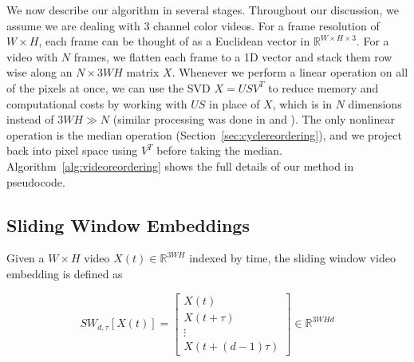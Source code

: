 \documentclass{article}
\begin{document}
We now describe our algorithm in several stages.  Throughout our discussion, we assume we are dealing with 3 channel color videos.  For a frame resolution of $W \times H$, each frame can be thought of as a Euclidean vector in $\mathbb{R}^{W \times H \times 3}$.  For a video with $N$ frames, we flatten each frame to a 1D vector and stack them row wise along an $N \times 3WH$ matrix $X$.  Whenever we perform a linear operation on all of the pixels at once, we can use the SVD $X = USV^T$ to reduce memory and computational costs by working with $US$ in place of $X$, which is in $N$ dimensions instead of $3WH \gg N$ (similar processing was done in \cite{turk1991eigenfaces} and \cite{tralie2017quasi}).  The only nonlinear operation is the median operation (Section~\ref{sec:cyclereordering}), and we project back into pixel space using $V^T$ before taking the median. Algorithm~\ref{alg:videoreordering} shows the full details of our method in pseudocode.

\subsection{Sliding Window Embeddings}
\label{sec:slidingwindow}

Given a $W \times H$ video $X(t) \in \mathbb{R}^{3WH}$ indexed by time, the sliding window video embedding \cite{cao1998dynamics,traliehigh,tralie2017quasi} is defined as

\begin{equation}
SW_{d, \tau}[X(t)] = \left[ \begin{array}{c} X(t) \\ X(t + \tau) \\ \vdots \\ X(t + (d-1)\tau)  \end{array} \right] \in \mathbb{R}^{3WHd}
\end{equation}
\end{document}
